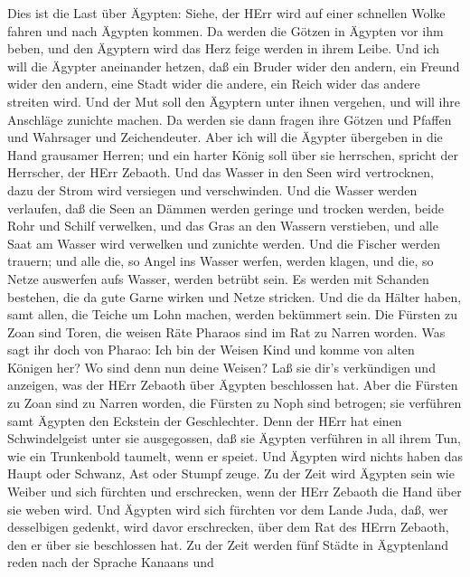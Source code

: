  Dies ist die Last über Ägypten: Siehe, der HErr wird auf
einer schnellen Wolke fahren und nach Ägypten kommen. Da werden die
Götzen in Ägypten vor ihm beben, und den Ägyptern wird das Herz feige
werden in ihrem Leibe.  Und ich will die Ägypter aneinander
hetzen, daß ein Bruder wider den andern, ein Freund wider den andern,
eine Stadt wider die andere, ein Reich wider das andere streiten wird.
 Und der Mut soll den Ägyptern unter ihnen vergehen, und
will ihre Anschläge zunichte machen. Da werden sie dann fragen ihre
Götzen und Pfaffen und Wahrsager und Zeichendeuter.  Aber
ich will die Ägypter übergeben in die Hand grausamer Herren; und ein
harter König soll über sie herrschen, spricht der Herrscher, der HErr
Zebaoth.  Und das Wasser in den Seen wird vertrocknen, dazu
der Strom wird versiegen und verschwinden.  Und die Wasser
werden verlaufen, daß die Seen an Dämmen werden geringe und trocken
werden, beide Rohr und Schilf verwelken,  und das Gras an
den Wassern verstieben, und alle Saat am Wasser wird verwelken und
zunichte werden.  Und die Fischer werden trauern; und alle
die, so Angel ins Wasser werfen, werden klagen, und die, so Netze
auswerfen aufs Wasser, werden betrübt sein.  Es werden mit
Schanden bestehen, die da gute Garne wirken und Netze stricken.
 Und die da Hälter haben, samt allen, die Teiche um Lohn
machen, werden bekümmert sein.  Die Fürsten zu Zoan sind
Toren, die weisen Räte Pharaos sind im Rat zu Narren worden. Was sagt
ihr doch von Pharao: Ich bin der Weisen Kind und komme von alten Königen
her?  Wo sind denn nun deine Weisen? Laß sie dir's
verkündigen und anzeigen, was der HErr Zebaoth über Ägypten beschlossen
hat.  Aber die Fürsten zu Zoan sind zu Narren worden, die
Fürsten zu Noph sind betrogen; sie verführen samt Ägypten den Eckstein
der Geschlechter.  Denn der HErr hat einen Schwindelgeist
unter sie ausgegossen, daß sie Ägypten verführen in all ihrem Tun, wie
ein Trunkenbold taumelt, wenn er speiet.  Und Ägypten wird
nichts haben das Haupt oder Schwanz, Ast oder Stumpf zeuge.
 Zu der Zeit wird Ägypten sein wie Weiber und sich fürchten
und erschrecken, wenn der HErr Zebaoth die Hand über sie weben wird.
 Und Ägypten wird sich fürchten vor dem Lande Juda, daß,
wer desselbigen gedenkt, wird davor erschrecken, über dem Rat des HErrn
Zebaoth, den er über sie beschlossen hat.  Zu der Zeit
werden fünf Städte in Ägyptenland reden nach der Sprache Kanaans und
